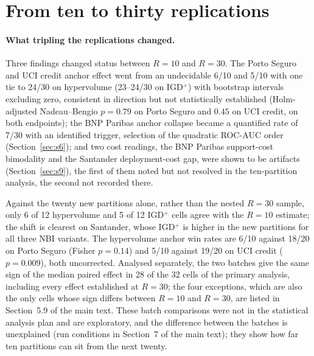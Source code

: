 \documentclass[11pt,a4paper]{article}
\begin{document}
\section{From ten to thirty replications}
\label{sec:s11}


\paragraph{What tripling the replications changed.} Three findings changed status between $R = 10$ and $R = 30$. The
Porto Seguro and UCI credit anchor effect went from an undecidable 6/10 and 5/10 with one tie to 24/30 on hypervolume
(23--24/30 on IGD$^+$) with bootstrap intervals excluding zero, consistent in direction but not statistically
established (Holm-adjusted Nadeau--Bengio $p = 0.79$ on Porto Seguro and $0.45$ on UCI credit, on both endpoints); the
BNP Paribas anchor collapse became a quantified rate of 7/30 with an identified trigger, selection of the quadratic
ROC-AUC order (Section~\ref{sec:s6}); and two cost readings, the BNP Paribas support-cost bimodality and the Santander
deployment-cost gap, were shown to be artifacts (Section~\ref{sec:s9}), the first of them noted but not resolved in the
ten-partition analysis, the second not recorded there.

Against the twenty new partitions alone, rather than the nested $R = 30$ sample, only 6 of 12 hypervolume and 5 of 12
IGD$^+$ cells agree with the $R = 10$ estimate; the shift is clearest on Santander, whose IGD$^+$ is higher in the new
partitions for all three NBI variants. The hypervolume anchor win rates are 6/10 against 18/20 on Porto Seguro (Fisher
$p = 0.14$) and 5/10 against 19/20 on UCI credit ($p = 0.009$), both uncorrected. Analysed separately, the two batches
give the same sign of the median paired effect in 28 of the 32 cells of the primary analysis, including every effect
established at $R = 30$; the four exceptions, which are also the only cells whose sign differs between $R = 10$ and
$R = 30$, are listed in Section~5.9 of the main text. These batch comparisons were not in the statistical analysis
plan and are exploratory, and the difference between the batches is unexplained (run conditions in Section~7 of
the main text); they show how far ten partitions can sit from the next twenty.
\end{document}

